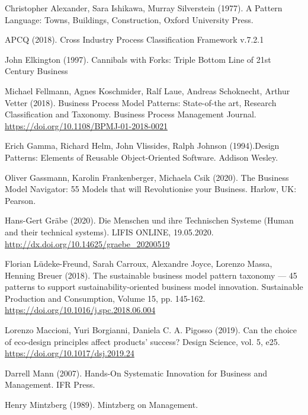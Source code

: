\documentclass[11pt,a4paper]{article}
\begin{document}
\begin{thebibliography}{xxx}
 Christopher Alexander, Sara Ishikawa, Murray Silverstein
  (1977). A Pattern Language: Towns, Buildings, Construction, Oxford
  University Press.

 APCQ (2018). Cross Industry Process Classification Framework
  v.7.2.1
  
 John Elkington (1997). Cannibals with Forks: Triple
  Bottom Line of 21st Century Business

 Michael Fellmann, Agnes Koschmider, Ralf Laue, Andreas
  Schoknecht, Arthur Vetter (2018).  Business Process Model Patterns:
  State-of-the art, Research Classification and Taxonomy.  Business Process
  Management Journal. \\ \url{https://doi.org/10.1108/BPMJ-01-2018-0021}
  
 Erich Gamma, Richard Helm, John Vlissides, Ralph Johnson
  (1994).Design Patterns: Elements of Reusable Object-Oriented Software.
  Addison Wesley.

 Oliver Gassmann, Karolin Frankenberger, Michaela Csik
  (2020). The Business Model Navigator: 55 Models that will Revolutionise your
  Business. Harlow, UK: Pearson.

 Hans-Gert Gräbe (2020). Die Menschen und ihre Technischen
  Systeme (Human and their technical systems).  LIFIS ONLINE, 19.05.2020.
  \url{http://dx.doi.org/10.14625/graebe_20200519}

 Florian Lüdeke-Freund, Sarah Carroux, Alexandre Joyce,
  Lorenzo Massa, Henning Breuer (2018). The sustainable business model pattern
  taxonomy — 45 patterns to support sustainability-oriented business model
  innovation.  Sustainable Production and Consumption, Volume 15,
  pp. 145-162. \\ \url{https://doi.org/10.1016/j.spc.2018.06.004}
  
 Lorenzo Maccioni, Yuri Borgianni, Daniela C. A. Pigosso
  (2019).  Can the choice of eco-design principles affect products’ success?
  Design Science, vol. 5, e25. \\ \url{https://doi.org/10.1017/dsj.2019.24}

 Darrell Mann (2007). Hands-On Systematic Innovation for
  Business and Management.  IFR Press.

 Henry Mintzberg (1989). Mintzberg on Management.


\end{thebibliography}
\end{document}
